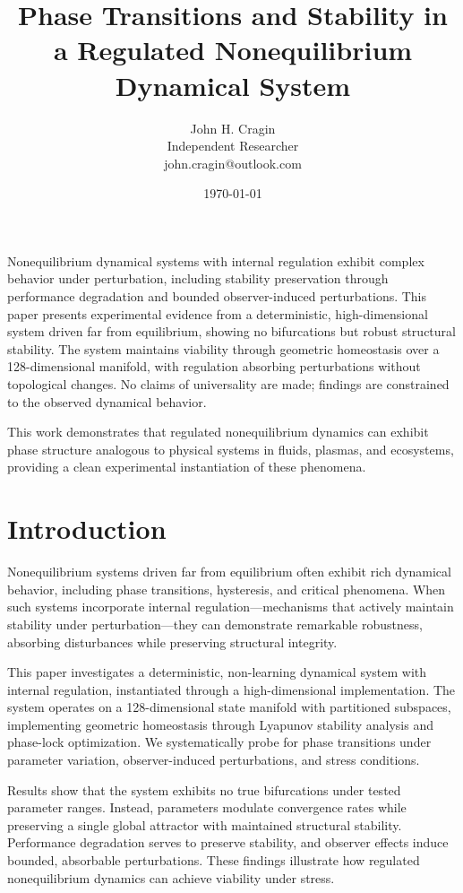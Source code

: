 \documentclass[12pt,a4paper]{report}
\title{Phase Transitions and Stability in a Regulated Nonequilibrium Dynamical System}
\author{John H. Cragin \\
Independent Researcher \\
john.cragin@outlook.com}
\date{\today}
\begin{document}
\maketitle

Nonequilibrium dynamical systems with internal regulation exhibit complex behavior under perturbation, including stability preservation through performance degradation and bounded observer-induced perturbations. This paper presents experimental evidence from a deterministic, high-dimensional system driven far from equilibrium, showing no bifurcations but robust structural stability. The system maintains viability through geometric homeostasis over a 128-dimensional manifold, with regulation absorbing perturbations without topological changes. No claims of universality are made; findings are constrained to the observed dynamical behavior.

This work demonstrates that regulated nonequilibrium dynamics can exhibit phase structure analogous to physical systems in fluids, plasmas, and ecosystems, providing a clean experimental instantiation of these phenomena.

\section{Introduction}

Nonequilibrium systems driven far from equilibrium often exhibit rich dynamical behavior, including phase transitions, hysteresis, and critical phenomena. When such systems incorporate internal regulation—mechanisms that actively maintain stability under perturbation—they can demonstrate remarkable robustness, absorbing disturbances while preserving structural integrity.

This paper investigates a deterministic, non-learning dynamical system with internal regulation, instantiated through a high-dimensional implementation. The system operates on a 128-dimensional state manifold with partitioned subspaces, implementing geometric homeostasis through Lyapunov stability analysis and phase-lock optimization. We systematically probe for phase transitions under parameter variation, observer-induced perturbations, and stress conditions.

Results show that the system exhibits no true bifurcations under tested parameter ranges. Instead, parameters modulate convergence rates while preserving a single global attractor with maintained structural stability. Performance degradation serves to preserve stability, and observer effects induce bounded, absorbable perturbations. These findings illustrate how regulated nonequilibrium dynamics can achieve viability under stress.
\end{document}
